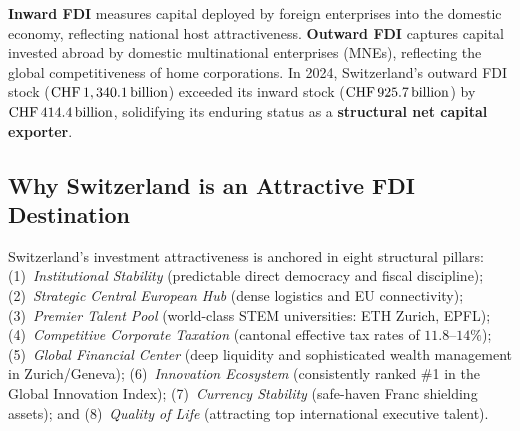 \textbf{Inward FDI} measures capital deployed by foreign enterprises into the domestic economy, reflecting national host attractiveness. \textbf{Outward FDI} captures capital invested abroad by domestic multinational enterprises (MNEs), reflecting the global competitiveness of home corporations. In 2024, Switzerland's outward FDI stock ($\text{CHF}\,1,340.1\,\text{billion}$) exceeded its inward stock ($\text{CHF}\,925.7\,\text{billion}$) by $\text{CHF}\,414.4\,\text{billion}$, solidifying its enduring status as a \textbf{structural net capital exporter}.

\subsection{Why Switzerland is an Attractive FDI Destination}

Switzerland's investment attractiveness is anchored in eight structural pillars: (1)~\textit{Institutional Stability} (predictable direct democracy and fiscal discipline); (2)~\textit{Strategic Central European Hub} (dense logistics and EU connectivity); (3)~\textit{Premier Talent Pool} (world-class STEM universities: ETH Zurich, EPFL); (4)~\textit{Competitive Corporate Taxation} (cantonal effective tax rates of $11.8\text{--}14\%$); (5)~\textit{Global Financial Center} (deep liquidity and sophisticated wealth management in Zurich/Geneva); (6)~\textit{Innovation Ecosystem} (consistently ranked \#1 in the Global Innovation Index); (7)~\textit{Currency Stability} (safe-haven Franc shielding assets); and (8)~\textit{Quality of Life} (attracting top international executive talent).

